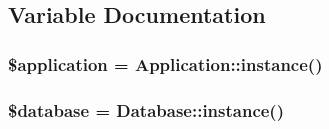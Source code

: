 \subsection{Variable Documentation}
\hypertarget{main_8php_a537fa9b460dddc2a67074faab810398a}{
\subsubsection[{\$application}]{\setlength{\rightskip}{0pt plus 5cm}\$application = Application::instance()}}
\label{main_8php_a537fa9b460dddc2a67074faab810398a}
\hypertarget{main_8php_a7691c0162d89de0b6ba47edcd8ba8878}{
\subsubsection[{\$database}]{\setlength{\rightskip}{0pt plus 5cm}\$database = Database::instance()}}
\label{main_8php_a7691c0162d89de0b6ba47edcd8ba8878}
